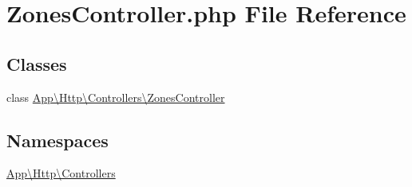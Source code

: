 \hypertarget{_zones_controller_8php}{}\section{Zones\+Controller.\+php File Reference}
\label{_zones_controller_8php}
\subsection*{Classes}
\begin{DoxyCompactItemize}
\item 
class \mbox{\hyperlink{class_app_1_1_http_1_1_controllers_1_1_zones_controller}{App\textbackslash{}\+Http\textbackslash{}\+Controllers\textbackslash{}\+Zones\+Controller}}
\end{DoxyCompactItemize}
\subsection*{Namespaces}
\begin{DoxyCompactItemize}
\item 
 \mbox{\hyperlink{namespace_app_1_1_http_1_1_controllers}{App\textbackslash{}\+Http\textbackslash{}\+Controllers}}
\end{DoxyCompactItemize}
